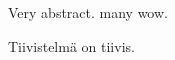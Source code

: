 \begin{abstractpage}[english]
	Very abstract. many wow.
\end{abstractpage}

\newpage

\begin{abstractpage}[finnish]
	Tiivistelmä on tiivis.
\end{abstractpage}
